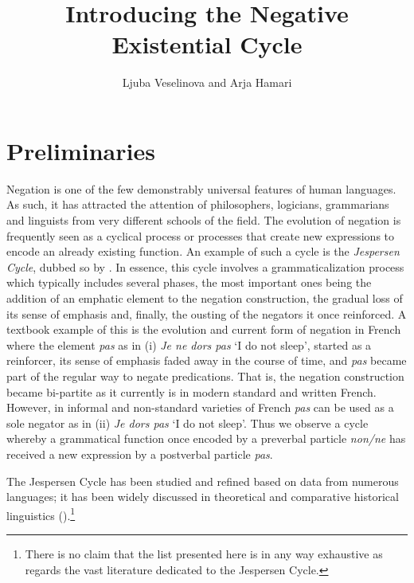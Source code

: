\documentclass[output=paper,chinesefont,colorlinks,citecolor=brown]{langscibook}
\title{Introducing the Negative Existential Cycle}
\author{Ljuba Veselinova\affiliation{University of Stockholm}  and Arja Hamari\affiliation{University of Helsinki;University of Turku}}
\begin{document}
\maketitle
\section{Preliminaries}\label{sect:preliminaries}\label{sec:intro:1}
Negation is one of the few demonstrably universal features of human languages. As such, it has attracted the attention of philosophers, logicians, grammarians and linguists from very different schools of the field. The evolution of negation is frequently seen as a cyclical process or processes that create new expressions to encode an already existing function. An example of such a cycle is the \textit{Jespersen Cycle}, dubbed so by \citet{Dahl1979}. In essence, this cycle involves a grammaticalization process which typically includes several phases, the most important ones being the addition of an emphatic element to the negation construction, the gradual loss of its sense of emphasis and, finally, the ousting of the negators it once reinforced. A textbook example of this is the evolution and current form of negation in French where the element \textit{pas} as in
(i) \textit{Je ne dors pas} ‘I do not sleep’, started as a reinforcer, its sense of emphasis faded away in the course of time, and \textit{pas} became part of the regular way to negate predications. That is, the negation construction became bi-partite as it currently is in modern standard and written French. However, in informal and non-standard varieties of French \textit{pas} can be used as a sole negator as in
(ii) \textit{Je dors pas} ‘I do not sleep’. Thus we observe a cycle whereby a grammatical function once encoded by a preverbal particle \textit{non/ne} has received a new expression by a postverbal particle \textit{pas}. 

The Jespersen Cycle has been studied and refined based on data from numerous languages; it has been widely discussed in theoretical and comparative historical linguistics (\citealt{Auwera2009,vanderAuwera2016,Auwera2010,Gelderen2011,Gelderen2016,Vossen2016,DevosTshibanda2010,MosegaardHansen2009,VossenAuwera2014,DevosAuwera2013,ngangoumWhenSynchronyMeets2015}).\footnote{There is no claim that the list presented here is in any way exhaustive as regards the vast literature dedicated to the Jespersen Cycle.}
\end{document}
